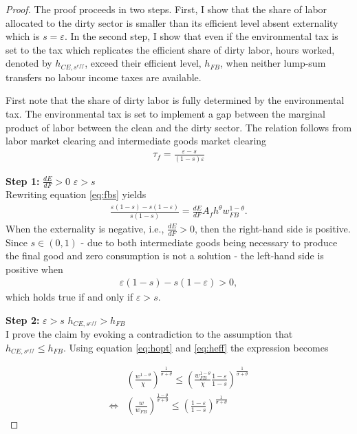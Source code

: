 \begin{proof}
	The proof proceeds in two steps. First, I show that the share of labor allocated to the dirty sector is smaller than its efficient level absent externality which is $s=\varepsilon$.
	In the second step, I show that even if the environmental tax is set to the tax which replicates the efficient share of dirty labor, hours worked, denoted by $h_{CE, s^{eff}}$, exceed their efficient level, $h_{FB}$, when neither lump-sum transfers no labour income taxes are available. 
	
	First note that the share of dirty labor is fully determined by the environmental tax. The environmental tax is set to implement a gap between the marginal product of labor between the clean and the dirty sector. The relation follows from labor market clearing and intermediate goods market clearing 
	\begin{align}
	\tau_f = \frac{\varepsilon-s}{(1-s)\varepsilon}\label{eq:tauf}
	\end{align}
	
	\textbf{Step 1:} $\frac{dE}{dF}>0$ \ar $\varepsilon>s$\\
	Rewriting equation \ref{eq:fbs} yields
	\begin{align}
	\frac{\varepsilon(1-s)-s(1-\varepsilon)}{s(1-s)}=\frac{dE}{dF}A_fh^\theta w_{FB}^{1-\theta}.
	\end{align}
	When the externality is negative, i.e., $\frac{dE}{dF}>0$, then the right-hand side is positive.
	Since $s\in(0,1)$ - due to both intermediate goods being necessary to produce the final good and zero consumption is not a solution - the left-hand side is positive when
	\begin{align}
	\varepsilon(1-s)-s(1-\varepsilon)>0,
	\end{align}
	which holds true if and only if $\varepsilon>s$.
	
	\textbf{Step 2:} $\varepsilon>s$ \ar $h_{CE, s^{eff}}>h_{FB}$\\
	I prove the claim by evoking a contradiction to the assumption that $h_{CE, s^{eff}}\leq h_{FB}$. Using equation \ref{eq:hopt} and \ref{eq:heff} the expression becomes
	
	\begin{align}
	&\left(\frac{w^{1-\theta}}{\chi}\right)^{\frac{1}{\sigma+\theta}}\leq \left(\frac{w_{FB}^{1-\theta}}{\chi}\frac{1-\varepsilon}{1-s}\right)^\frac{1}{\sigma+\theta}
	\\
	\Leftrightarrow&\left(\frac{w}{w_{FB}}\right)^{\frac{1-\theta}{\sigma+\theta}}\leq \left(\frac{1-\varepsilon}{1-s}\right)^\frac{1}{\sigma+\theta}
	\end{align}
	

\end{proof}
